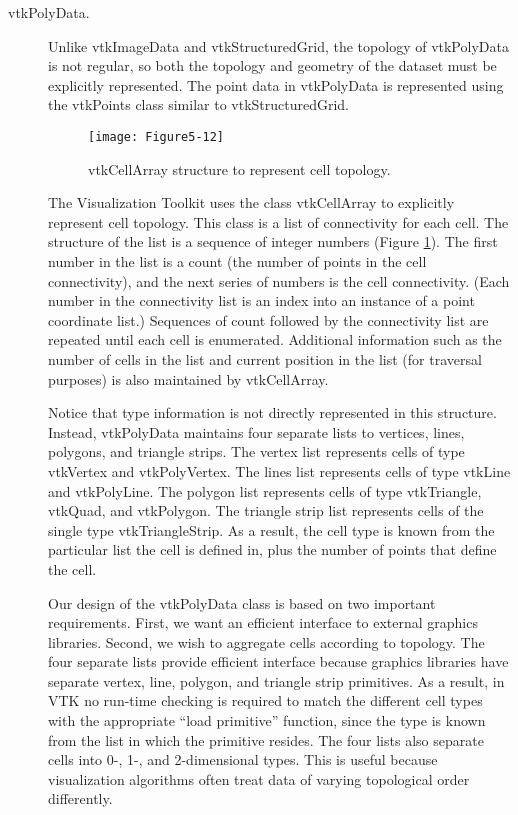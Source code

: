 \begin{description}
\item[vtkPolyData.] Unlike vtkImageData and vtkStructuredGrid, the topology of vtkPolyData is not regular, so both the topology and geometry of the dataset must be explicitly represented. The point data in vtkPolyData is represented using the vtkPoints class similar to vtkStructuredGrid.

\begin{figure}[!htb]
	\centering
	\texttt{[image: Figure5-12]}
	\caption{vtkCellArray structure to represent cell topology.}
	\label{fig:Figure5-12}
\end{figure}

The Visualization Toolkit uses the class vtkCellArray to explicitly represent cell topology. This class is a list of connectivity for each cell. The structure of the list is a sequence of integer numbers (Figure \ref{fig:Figure5-12}). The first number in the list is a count (the number of points in the cell connectivity), and the next series of numbers is the cell connectivity. (Each number in the connectivity list is an index into an instance of a point coordinate list.) Sequences of count followed by the connectivity list are repeated until each cell is enumerated. Additional information such as the number of cells in the list and current position in the list (for traversal purposes) is also maintained by vtkCellArray.

Notice that type information is not directly represented in this structure. Instead, vtkPolyData maintains four separate lists to vertices, lines, polygons, and triangle strips. The vertex list represents cells of type vtkVertex and vtkPolyVertex. The lines list represents cells of type vtkLine and vtkPolyLine. The polygon list represents cells of type vtkTriangle, vtkQuad, and vtkPolygon. The triangle strip list represents cells of the single type vtkTriangleStrip. As a result, the cell type is known from the particular list the cell is defined in, plus the number of points that define the cell.

Our design of the vtkPolyData class is based on two important requirements. First, we want an efficient interface to external graphics libraries. Second, we wish to aggregate cells according to topology. The four separate lists provide efficient interface because graphics libraries have separate vertex, line, polygon, and triangle strip primitives. As a result, in VTK no run-time checking is required to match the different cell types with the appropriate ``load primitive'' function, since the type is known from the list in which the primitive resides. The four lists also separate cells into 0-, 1-, and 2-dimensional types. This is useful because visualization algorithms often treat data of varying topological order differently.


\end{description}
